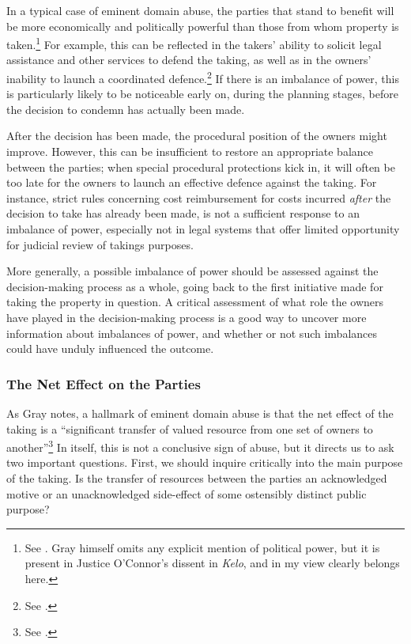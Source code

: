 In a typical case of eminent domain abuse, the parties that stand to benefit will be more economically and politically powerful than those from whom property is taken.\footnote{See \cite[30-31]{gray11}. Gray himself omits any explicit mention of political power, but it is present in Justice O'Connor's dissent in {\it Kelo}, and in my view clearly belongs here.} For example, this can be reflected in the takers' ability to solicit legal assistance and other services to defend the taking, as well as in the  owners' inability to launch a coordinated defence.\footnote{See \cite[30-31]{gray11}.} If there is an imbalance of power, this is particularly likely to be noticeable early on, during the planning stages, before the decision to condemn has actually been made. 

After the decision has been made, the procedural position of the owners might improve. However, this can be insufficient to restore an appropriate balance between the parties; when special procedural protections kick in, it will often be too late for the owners to launch an effective defence against the taking. For instance, strict rules concerning cost reimbursement for costs incurred {\it after} the decision to take has already been made, is not a sufficient response to an imbalance of power, especially not in legal systems that offer limited opportunity for judicial review of takings purposes.

More generally, a possible imbalance of power should be assessed against the decision-making process as a whole, going back to the first initiative made for taking the property in question. A critical  assessment of what role the owners have played in the decision-making process is a good way to uncover more information about imbalances of power, and whether or not such imbalances could have unduly influenced the outcome.

\subsubsection*{The Net Effect on the Parties}

As Gray notes, a hallmark of eminent domain abuse is that the net effect of the taking is a ``significant transfer of valued resource from one set of owners to another''\footnote{See \cite[31]{gray11}.} In itself, this is not a conclusive sign of abuse, but it directs us to ask two important questions. First, we should inquire critically into the main purpose of the taking. Is the transfer of resources between the parties an acknowledged motive or an unacknowledged side-effect of some ostensibly distinct public purpose?

